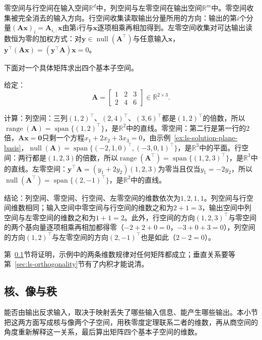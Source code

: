 零空间与行空间在输入空间$\mathbb R^d$中，列空间与左零空间在输出空间$\mathbb R^m$中。零空间收集被完全消去的输入方向。行空间收集读取输出分量所用的方向：输出的第$i$个分量$(\bm A\bm x)_i=\bm A_{i,:}\bm x$由第$i$行与$\bm x$逐项相乘再相加得到。左零空间收集对可达输出读数恒为零的加权方式：对$\bm y\in\operatorname{null}(\bm A^\top)$与任意输入$\bm x$，$\bm y^\top(\bm A\bm x)=(\bm y^\top\bm A)\bm x=0$。

下面对一个具体矩阵求出四个基本子空间。
\begin{example}
\label{ex:ls-rank-one-four-subspaces}
给定：
\[
 \bm A=\begin{bmatrix}1&2&3\\2&4&6\end{bmatrix}\in\mathbb R^{2\times3}.
\]

计算：列空间：三列$(1,2)^\top$、$(2,4)^\top$、$(3,6)^\top$都是$(1,2)^\top$的倍数，所以$\operatorname{range}(\bm A)=\operatorname{span}\{(1,2)^\top\}$，是$\mathbb R^2$中的直线。零空间：第二行是第一行的$2$倍，$\bm A\bm x=\bm0$只剩一个方程$x_1+2x_2+3x_3=0$，由示例~\ref{ex:ls-solution-plane-basis}，$\operatorname{null}(\bm A)=\operatorname{span}\{(-2,1,0)^\top,(-3,0,1)^\top\}$，是$\mathbb R^3$中的平面。行空间：两行都是$(1,2,3)$的倍数，所以$\operatorname{range}(\bm A^\top)=\operatorname{span}\{(1,2,3)^\top\}$，是$\mathbb R^3$中的直线。左零空间：$\bm y^\top\bm A=(y_1+2y_2)(1,2,3)$为零当且仅当$y_1=-2y_2$，所以$\operatorname{null}(\bm A^\top)=\operatorname{span}\{(2,-1)^\top\}$，是$\mathbb R^2$中的直线。

结论：列空间、零空间、行空间、左零空间的维数依次为$1,2,1,1$。列空间与行空间维数相同；输入空间中零空间与行空间的维数之和为$2+1=3$，输出空间中列空间与左零空间的维数之和为$1+1=2$。此外，行空间的方向$(1,2,3)^\top$与零空间的两个基向量逐项相乘再相加都得零（$-2+2+0=0$，$-3+0+3=0$），列空间的方向$(1,2)^\top$与左零空间的方向$(2,-1)^\top$也是如此（$2-2=0$）。
\end{example}
第~\ref{sec:ls-kernel-image}节将证明，示例中的两条维数规律对任何矩阵都成立；垂直关系要等第~\ref{sec:ls-orthogonality}节有了内积才能说清。

\subsection{核、像与秩}
\label{sec:ls-kernel-image}

能否由输出反求输入，取决于映射丢失了哪些输入信息、能产生哪些输出。本小节把这两方面写成核与像两个子空间，用秩零度定理联系二者的维数，再从商空间的角度重新解释这一关系，最后算出矩阵四个基本子空间的维数。

